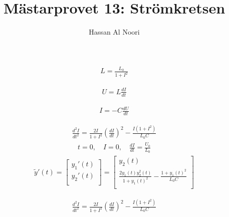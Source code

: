 \documentclass[a4paper]{article}
\title{Mästarprovet 13: Strömkretsen}
\author{Hassan Al Noori}
\begin{document}
\begin{Huge}


\begin{align*}
L = \frac{L_{0}}{1+I^{2}}
\end{align*} 

\begin{align*}
U = L\frac{dI}{dt}
\end{align*} 


\begin{align*}
I = -C\frac{dU}{dt}
\end{align*}

\begin{align*}
\frac{d^{2}I}{dt^{2}}= \frac{2I}{1+I^{2}}\left(\frac{dI}{dt}\right)^{2}-\frac{I(1+I^{2})}{L_{0}C}
\end{align*}
\begin{align*}
t=0, \quad I=0, \quad \frac{dI}{dt}=\frac{U_{0}}{L_{0}}
\end{align*}
\begin{align*}
\tilde{y}'(t) =
\begin{bmatrix}
y_{1}'(t) \\ 
y_{2}'(t) \\
\end{bmatrix}
= \begin{bmatrix}
y_{2}(t)\\
\frac{2y_{1}(t)y_{2}^{2}(t)}{1+y_{1}(t)^2}-\frac{1+y_{1}(t)^{2}}{L_{0}C}\\
\end{bmatrix}
\end{align*}


\begin{align*}
\frac{d^{2}I}{dt^{2}}=\frac{2I}{1+I^{2}}\left(\frac{dI}{dt}\right)^{2}-\frac{I\left(1+I^{2}\right)}{L_{0}C}
\end{align*}
\end{Huge}
\begin{equation*}
\begin{aligned}
\end{aligned}
\end{equation*}
\LARGE
\end{document}
